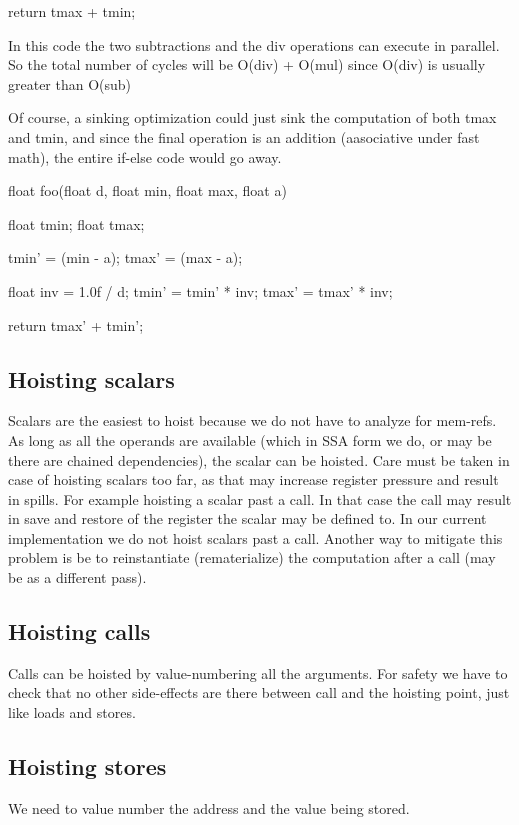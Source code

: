 \begin{section}
\begin{program}
{  return tmax + tmin;
}

\end{program}

In this code the two subtractions and the div operations can execute in parallel. So the total number of cycles will be
O(div) + O(mul)
since O(div) is usually greater than O(sub)

Of course, a sinking optimization could just sink the computation of both tmax and tmin, and since the final operation is an addition (aasociative under fast math), the entire if-else
code would go away.

\begin{program}
float foo(float d, float min, float max, float a)
{
  float tmin;
  float tmax;

  tmin' = (min - a);
  tmax' = (max - a);

  float inv = 1.0f / d;
  tmin' = tmin' * inv;
  tmax' = tmax' * inv;

  return tmax' + tmin';
}
\end{program}

\section{Hoisting scalars}
Scalars are the easiest to hoist because we do not have to analyze for mem-refs. As long as all the
operands are available (which in SSA form we do, or may be there are chained dependencies), the scalar can
be hoisted. Care must be taken in case of hoisting scalars too far, as that may increase register pressure
and result in spills. For example hoisting a scalar past a call. In that case the call may result in
save and restore of the register the scalar may be defined to. In our current implementation
we do not hoist scalars past a call. Another way to mitigate this problem is be to
reinstantiate (rematerialize) the computation after a call (may be as a different pass).

\section{Hoisting calls}
Calls can be hoisted by value-numbering all the arguments. For safety we have to check that no other side-effects are there
between call and the hoisting point, just like loads and stores.

\section{Hoisting stores}
We need to value number the address and the value being stored.


\end{section}
